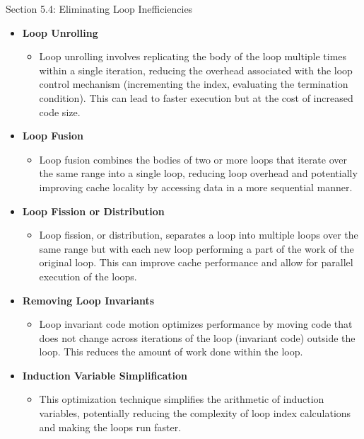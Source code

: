 \begin{notes}{Section 5.4: Eliminating Loop Inefficiencies}
    \begin{itemize}
        \item \textbf{Loop Unrolling}
        \begin{itemize}
            \item Loop unrolling involves replicating the body of the loop multiple times within a single iteration, reducing the overhead associated with the loop control mechanism (incrementing 
            the index, evaluating the termination condition). This can lead to faster execution but at the cost of increased code size.
        \end{itemize}
        \item \textbf{Loop Fusion}
        \begin{itemize}
            \item Loop fusion combines the bodies of two or more loops that iterate over the same range into a single loop, reducing loop overhead and potentially improving cache locality by accessing 
            data in a more sequential manner.
        \end{itemize}
        \item \textbf{Loop Fission or Distribution}
        \begin{itemize}
            \item Loop fission, or distribution, separates a loop into multiple loops over the same range but with each new loop performing a part of the work of the original loop. This can improve 
            cache performance and allow for parallel execution of the loops.
        \end{itemize}
        \item \textbf{Removing Loop Invariants}
        \begin{itemize}
            \item Loop invariant code motion optimizes performance by moving code that does not change across iterations of the loop (invariant code) outside the loop. This reduces the amount of work 
            done within the loop.
        \end{itemize}
        \item \textbf{Induction Variable Simplification}
        \begin{itemize}
            \item This optimization technique simplifies the arithmetic of induction variables, potentially reducing the complexity of loop index calculations and making the loops run faster.
        \end{itemize}

\end{itemize}
\end{notes}

